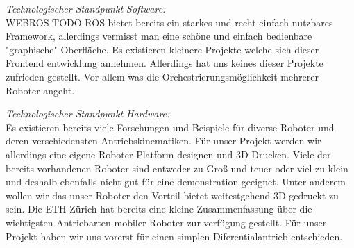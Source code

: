 \begin{flushleft}
    \textit{Technologischer Standpunkt Software:}\\
    WEBROS TODO
    ROS bietet bereits ein starkes und recht einfach nutzbares Framework, allerdings vermisst man eine 
    schöne und einfach bedienbare "graphische" Oberfläche.
    Es existieren kleinere Projekte welche sich dieser Frontend entwicklung annehmen. 
    Allerdings hat uns keines dieser Projekte zufrieden gestellt. 
    Vor allem was die Orchestrierungsmöglichkeit mehrerer Roboter angeht.
\end{flushleft}

\begin{flushleft}
    \textit{Technologischer Standpunkt Hardware:} \\
    Es existieren bereits viele Forschungen und Beispiele für diverse Roboter
    und deren verschiedensten Antriebskinematiken.
    Für unser Projekt werden wir allerdings eine eigene Roboter Platform designen und 3D-Drucken.
    Viele der bereits vorhandenen Roboter sind entweder zu Groß und teuer oder viel zu klein und deshalb ebenfalls nicht 
    gut für eine demonstration geeignet. Unter anderem wollen wir das unser Roboter den Vorteil bietet weitestgehend
    3D-gedruckt zu sein.
    Die ETH Zürich hat bereits eine kleine Zusammenfassung über die wichtigsten Antriebarten mobiler Roboter zur verfügung gestellt.
    Für unser Projekt haben wir uns vorerst für einen simplen Diferentialantrieb entschieden. 
\end{flushleft}
